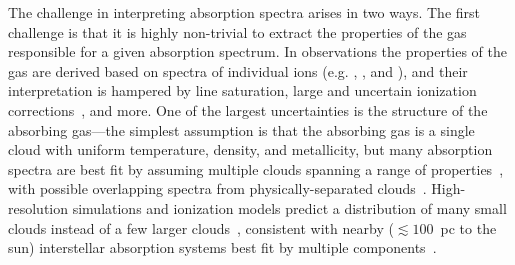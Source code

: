 \documentclass[fleqn,usenatbib]{mnras}
\begin{document}
The challenge in interpreting absorption spectra arises in two ways.
The first challenge is that it is highly non-trivial to extract the properties of the gas responsible for a given absorption spectrum.
In observations the properties of the gas are derived based on spectra of individual ions (e.g. , , and ), and their interpretation is hampered by line saturation, large and uncertain ionization corrections~\citep[e.g.][]{schaye2006Importance, acharya2021How}, and more.
One of the largest uncertainties is the structure of the absorbing gas---the simplest assumption is that the absorbing gas is a single cloud with uniform temperature, density, and metallicity, but many absorption spectra are best fit by assuming multiple clouds spanning a range of properties~\citep[e.g.][]{boksenberg1979Multiple, muzahid2015Extreme, liang2017BayesVP, Lehner2019,Wotta2019, haislmaier2021COS, sameer2021Cloudbycloud, zahedy2021.CUBS.III.zle1.LLSs, marra2021.cosmo.sims.test.observational.modeling, narayanan2021.a.multiphase.pLLS, nielsen2022Complex}, with possible overlapping spectra from physically-separated clouds~\citep[e.g.][]{marra2022Examining}.
High-resolution simulations and ionization models predict a distribution of many small clouds instead of a few larger clouds~\citep[e.g.][]{fielding2020Multiphase, lehner2019COS},
consistent with nearby ($\lesssim 100$~pc to the sun) interstellar absorption systems best fit by multiple components~\citep[e.g.][]{welsh2010HighResolution}.
\end{document}
